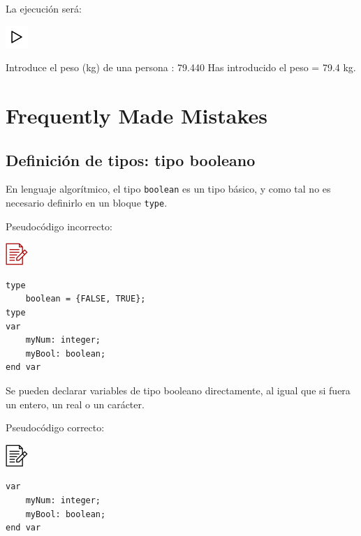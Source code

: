 \documentclass[
]{book}
\newenvironment{Shaded}{\begin{snugshade}}{\end{snugshade}}
\newcommand{\FloatTok}[1]{\textcolor[rgb]{0.00,0.00,0.81}{#1}}
\newcommand{\NormalTok}[1]{#1}
\begin{document}
La ejecución será:

\includegraphics{./img/play.png}

\begin{Shaded}
\begin{Highlighting}[]
\NormalTok{Introduce el peso (kg) de una persona : }\FloatTok{79.440}
\NormalTok{Has introducido el peso = }\FloatTok{79.4}\NormalTok{ kg.}
\end{Highlighting}
\end{Shaded}

\hypertarget{frequently-made-mistakes}{%
\section{Frequently Made Mistakes}\label{frequently-made-mistakes}}

\hypertarget{definiciuxf3n-de-tipos-tipo-booleano}{%
\subsection{Definición de tipos: tipo booleano}\label{definiciuxf3n-de-tipos-tipo-booleano}}

En lenguaje algorítmico, el tipo \texttt{boolean} es un tipo básico, y como tal no es necesario definirlo en un bloque \texttt{type}.

Pseudocódigo incorrecto:

\includegraphics{./img/alg_err.png}

\begin{verbatim}
type
    boolean = {FALSE, TRUE};
type
var 
    myNum: integer;
    myBool: boolean;
end var
\end{verbatim}

Se pueden declarar variables de tipo booleano directamente, al igual que si fuera un entero, un real o un carácter.

Pseudocódigo correcto:

\includegraphics{./img/alg.png}

\begin{verbatim}
var 
    myNum: integer;
    myBool: boolean;
end var
\end{verbatim}
\end{document}
